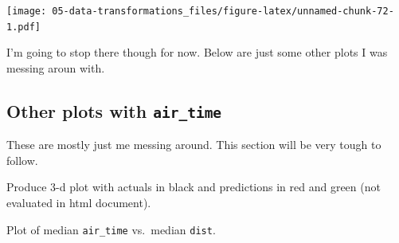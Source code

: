 \documentclass[]{book}
\newenvironment{Shaded}{\begin{snugshade}}{\end{snugshade}}
\newcommand{\CommentTok}[1]{\textcolor[rgb]{0.56,0.35,0.01}{\textit{#1}}}
\newcommand{\DataTypeTok}[1]{\textcolor[rgb]{0.13,0.29,0.53}{#1}}
\newcommand{\DecValTok}[1]{\textcolor[rgb]{0.00,0.00,0.81}{#1}}
\newcommand{\KeywordTok}[1]{\textcolor[rgb]{0.13,0.29,0.53}{\textbf{#1}}}
\newcommand{\NormalTok}[1]{#1}
\newcommand{\OperatorTok}[1]{\textcolor[rgb]{0.81,0.36,0.00}{\textbf{#1}}}
\newcommand{\StringTok}[1]{\textcolor[rgb]{0.31,0.60,0.02}{#1}}
\theoremstyle{definition}
\theoremstyle{definition}
\theoremstyle{definition}
\theoremstyle{remark}
\begin{document}
\texttt{[image: 05-data-transformations\_files/figure-latex/unnamed-chunk-72-1.pdf]}

I'm going to stop there though for now. Below are just some other plots
I was messing aroun with.

\hypertarget{other-plots-with-air_time}{%
\subsection{\texorpdfstring{Other plots with
\texttt{air\_time}}{Other plots with air\_time}}\label{other-plots-with-air_time}}

These are mostly just me messing around. This section will be very tough
to follow.

Produce 3-d plot with actuals in black and predictions in red and green
(not evaluated in html document).

\begin{Shaded}
\end{Shaded}

Plot of median \texttt{air\_time} vs.~median \texttt{dist}.
\end{document}
